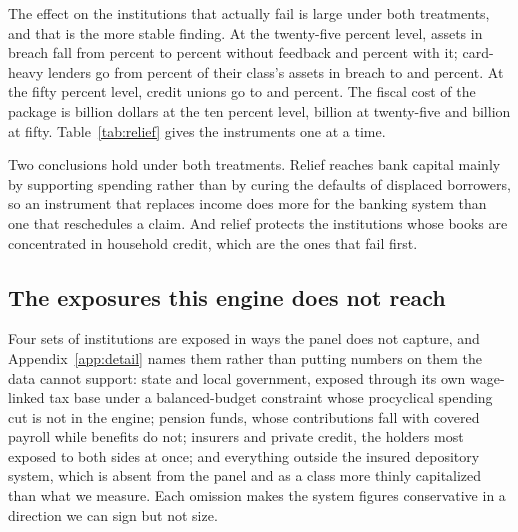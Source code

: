 The effect on the institutions that actually fail is large under both treatments, and that is the
more stable finding. At the twenty-five percent level, assets in breach fall from
 percent to  percent
without feedback and  percent with it; card-heavy lenders go
from  percent of their class's assets in breach to
 and  percent. At the fifty
percent level, credit unions go to  and
 percent. The fiscal cost of the package is
 billion dollars at the ten percent level,
 billion at twenty-five and  billion at fifty.
Table~\ref{tab:relief} gives the instruments one at a time.

\begin{table}[htbp]
\centering
\caption{Relief instruments against system bank losses, with the second round held fixed and with
demand feedback, by displacement level. Two treatments of one modeling choice with mismatched
horizons, not bounds; cells with no sourced fiscal cost read n/a. Scenario.}
\label{tab:relief}

\end{table}

Two conclusions hold under both treatments. Relief reaches bank capital mainly by supporting
spending rather than by curing the defaults of displaced borrowers, so an instrument that replaces
income does more for the banking system than one that reschedules a claim. And relief protects the
institutions whose books are concentrated in household credit, which are the ones that fail
first.

\subsection{The exposures this engine does not reach}

Four sets of institutions are exposed in ways the panel does not capture, and Appendix~\ref{app:detail} names them rather than putting numbers on them the data cannot support: state and local government, exposed through its own wage-linked tax base under a balanced-budget constraint whose procyclical spending cut is not in the engine; pension funds, whose contributions fall with covered payroll while benefits do not; insurers and private credit, the holders most exposed to both sides at once; and everything outside the insured depository system, which is absent from the panel and as a class more thinly capitalized than what we measure. Each omission makes the system figures conservative in a direction we can sign but not size.

